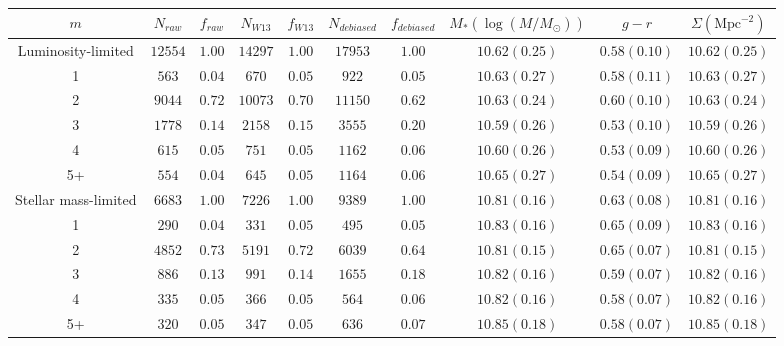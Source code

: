 \documentclass[useAMS,usenatbib]{mn2e}
\begin{document}
\begin{table}

\begin{tabular}{cccccccccc}
\hline
 $m$                    & $N_{raw}$   & $f_{raw}$   & $N_{W13}$   & $f_{W13}$   & $N_{debiased}$   & $f_{debiased}$   & $M_* (\log(M/M_{\odot}))$   & $g-r$            & $\Sigma \mathrm{(Mpc^{-2})}$  \\

\hline
 Luminosity-limited   & $12554$   & $1.00$    & $14297$   & $1.00$    & $17953$        & $1.00$         & $10.62 (0.25)$                     & $0.58 (0.10)$ & $10.62 (0.25)$               \\
 1                    & $563$     & $0.04$    & $670$     & $0.05$    & $922$          & $0.05$         & $10.63 (0.27)$                     & $0.58 (0.11)$ & $10.63 (0.27)$               \\
 2                    & $9044$    & $0.72$    & $10073$   & $0.70$    & $11150$        & $0.62$         & $10.63 (0.24)$                     & $0.60 (0.10)$ & $10.63 (0.24)$               \\
 3                    & $1778$    & $0.14$    & $2158$    & $0.15$    & $3555$         & $0.20$         & $10.59 (0.26)$                     & $0.53 (0.10)$ & $10.59 (0.26)$               \\
 4                    & $615$     & $0.05$    & $751$     & $0.05$    & $1162$         & $0.06$         & $10.60 (0.26)$                     & $0.53 (0.09)$ & $10.60 (0.26)$               \\
 5+                   & $554$     & $0.04$    & $645$     & $0.05$    & $1164$         & $0.06$         & $10.65 (0.27)$                     & $0.54 (0.09)$ & $10.65 (0.27)$               \\
 
\hline

 Stellar mass-limited & $6683$    & $1.00$    & $7226$    & $1.00$    & $9389$         & $1.00$         & $10.81 (0.16)$                     & $0.63 (0.08)$ & $10.81 (0.16)$               \\
 1                    & $290$     & $0.04$    & $331$     & $0.05$    & $495$          & $0.05$         & $10.83 (0.16)$                     & $0.65 (0.09)$ & $10.83 (0.16)$               \\
 2                    & $4852$    & $0.73$    & $5191$    & $0.72$    & $6039$         & $0.64$         & $10.81 (0.15)$                     & $0.65 (0.07)$ & $10.81 (0.15)$               \\
 3                    & $886$     & $0.13$    & $991$     & $0.14$    & $1655$         & $0.18$         & $10.82 (0.16)$                     & $0.59 (0.07)$ & $10.82 (0.16)$               \\
 4                    & $335$     & $0.05$    & $366$     & $0.05$    & $564$          & $0.06$         & $10.82 (0.16)$                     & $0.58 (0.07)$ & $10.82 (0.16)$               \\
 5+                   & $320$     & $0.05$    & $347$     & $0.05$    & $636$          & $0.07$         & $10.85 (0.18)$                     & $0.58 (0.07)$ & $10.85 (0.18)$               \\
\hline


\end{tabular}
\end{table}
\end{document}
